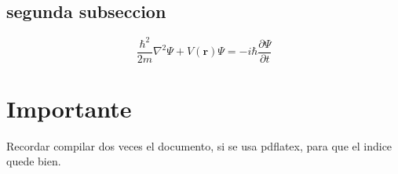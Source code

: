 \subsection{segunda subseccion}
$$ \frac{\hbar^2}{2m}\nabla^2\Psi + V(\mathbf{r})\Psi = -i\hbar \frac{\partial\Psi}{\partial t} $$

\section{Importante}
Recordar compilar dos veces el documento, si se usa pdflatex, para que el indice quede bien.
